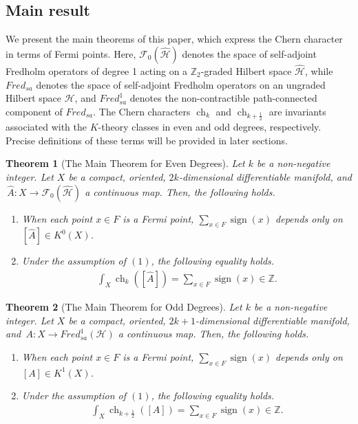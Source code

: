 \documentclass{amsart}
\newtheorem{thm}{Theorem}[section]
\theoremstyle{definition}
\theoremstyle{remark}
\begin{document}
\subsection{Main result}

We present the main theorems of this paper, which express the Chern character in terms of Fermi points. Here, \(\mathcal{F}_0(\hat{\mathcal{H}})\) denotes the space of self-adjoint Fredholm operators of degree 1 acting on a \(\mathbb{Z}_2\)-graded Hilbert space \(\hat{\mathcal{H}}\), while \(Fred_{sa}\) denotes the space of self-adjoint Fredholm operators on an ungraded Hilbert space \(\mathcal{H}\), and \(Fred_{sa}^1\) denotes the non-contractible path-connected component of \(Fred_{sa}\). The Chern characters \(\operatorname{ch}_k\) and \(\operatorname{ch}_{k+\frac{1}{2}}\) are invariants associated with the $K$-theory classes in even and odd degrees, respectively. Precise definitions of these terms will be provided in later sections.

\begin{thm}[The Main Theorem for Even Degrees]\label{thm:even main theorem}
  Let $k$ be a non-negative integer. Let $X$ be a compact, oriented, $2k$-dimensional differentiable manifold, and \,$\hat{A}\colon X\to \mathcal{F}_{0}(\mathcal{\hat{H}})$ a continuous map. Then, the following holds.
\begin{enumerate}
\item When each point $x \in F$ is a Fermi point, $\sum_{x \in F}\operatorname{sign}(x)$ depends only on $[\hat{A}] \in K^0(X)$.
\item Under the assumption of $(1)$, the following equality holds.
\begin{align*}
\int_X \operatorname{ch}_{k}([\hat{A}]) = \sum_{x \in F} \operatorname{sign}(x) \in \mathbb{Z}.
\end{align*}
\end{enumerate} 
\end{thm}

\begin{thm}[The Main Theorem for Odd Degrees]\label{thm:odd main theorem}
 Let $k$ be a non-negative integer. Let $X$ be a compact, oriented, $2k+1$-dimensional differentiable manifold, and \,$A\colon X\to Fred_{sa}^1(\mathcal{H})$ a continuous map. Then, the following holds.
\begin{enumerate}
\item When each point $x \in F$ is a Fermi point, $\sum_{x \in F}\operatorname{sign}(x)$ depends only on $[A] \in K^1(X)$.
\item Under the assumption of $(1)$, the following equality holds.
\begin{align*}
\int_X \operatorname{ch}_{k+\frac{1}{2}}([A]) = \sum_{x \in F} \operatorname{sign}(x) \in \mathbb{Z}.
\end{align*}
\end{enumerate}  
\end{thm}
\end{document}
